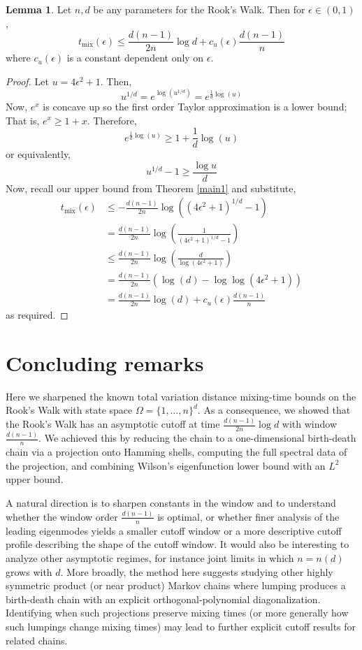 \documentclass{article}
\theoremstyle{definition}
\theoremstyle{definition}
\theoremstyle{definition}
\newtheorem{lemma}{Lemma}
\theoremstyle{definition}
\theoremstyle{named}
\begin{document}
  \begin{lemma}
   Let $n,d$ be any parameters for the Rook's Walk. Then for $\epsilon\in(0,1)$,
   \[t_\text{mix}(\epsilon) \leq \frac{d(n-1)}{2n} \log d + c_u(\epsilon) \frac{d(n-1)}{n}\]
   where $c_u(\epsilon)$ is a constant dependent only on $\epsilon$.
   \begin{proof}
      Let $u=4\epsilon^2+1$. Then,
      \[u^{1/d} =e^{\log(u^{1/d})}=e^{\frac{1}{d}\log(u)}\]
      Now, $e^x$ is concave up so the first order Taylor approximation is a lower bound; That is, $e^x \geq 1+x$. Therefore,
      \[e^{\frac{1}{d}\log (u)} \geq 1+ \frac{1}{d}\log( u)\]
      or equivalently,
      \[u^{1/d} -1 \geq \frac{\log u}{d}\]
      Now, recall our upper bound from Theorem \ref{main1} and substitute,
      \begin{align*}
          t_\text{mix}(\epsilon) &\leq -\frac{d(n-1)}{2n}\log\left((4\epsilon^2+1)^{1/d}-1 \right)\\
          &= \frac{d(n-1)}{2n}\log\left(\frac{1}{(4\epsilon^2+1)^{1/d}-1 }\right)\\
          &\leq \frac{d(n-1)}{2n}\log\left(\frac{d}{\log (4\epsilon^2 +1)}\right)\\
          &= \frac{d(n-1)}{2n}\left(\log(d) -\log\log(4\epsilon^2+1)\right)\\
          &= \frac{d(n-1)}{2n}\log(d) +c_u(\epsilon) \frac{d(n-1)}{n}
      \end{align*}
      as required.
      
   \end{proof}
  \end{lemma}
\section{Concluding remarks}\label{sec:conclusion}
Here we sharpened the known total variation distance mixing-time bounds on the Rook's Walk with state space $\Omega=\{1,\dots,n\}^d$. As a consequence, we showed that the Rook's Walk has an asymptotic cutoff at time $\frac{d(n-1)}{2n}\log d$ with window $\frac{d(n-1)}{n}$. We achieved this by reducing the chain to a one-dimensional birth-death chain via a projection onto Hamming shells, computing the full spectral data of the projection, and combining Wilson's eigenfunction lower bound with an \(L^2\) upper bound.

A natural direction is to sharpen constants in the window and to understand whether the window order \(\frac{d(n-1)}{n}\) is optimal, or whether finer analysis of the leading eigenmodes yields a smaller cutoff window or a more descriptive cutoff profile describing the shape of the cutoff window. It would also be interesting to analyze other asymptotic regimes, for instance joint limits in which \(n=n(d)\) grows with \(d\). More broadly, the method here suggests studying other highly symmetric product (or near product) Markov chains where lumping produces a birth-death chain with an explicit orthogonal-polynomial diagonalization. Identifying when such projections preserve mixing times (or more generally how such lumpings change mixing times) may lead to further explicit cutoff results for related chains.


   \pagebreak
   \printbibliography 
\end{document}
